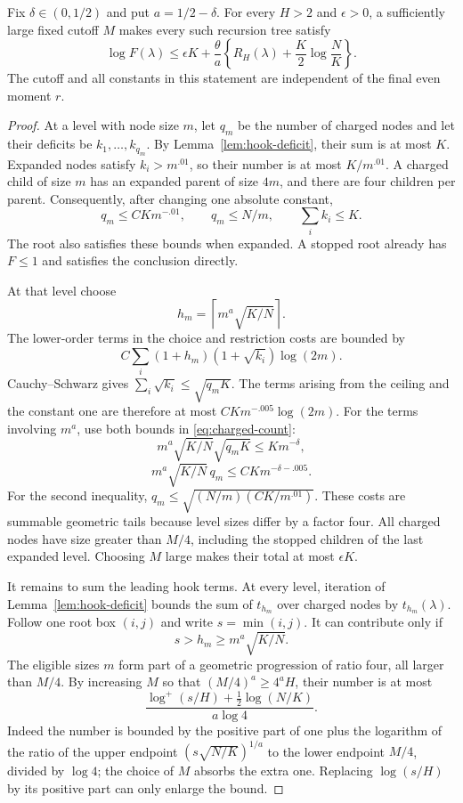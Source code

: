 \begin{lemma}\label{lem:tree-budget}
Fix $\delta\in(0,1/2)$ and put $a=1/2-\delta$. For every $H>2$ and $\epsilon>0$, a sufficiently large fixed cutoff $M$ makes every such recursion tree satisfy
\begin{equation}\label{eq:tree-budget}
 \log F(\lambda)\le\epsilon K+
 \frac\theta a\left\{
    R_H(\lambda)+\frac K2\log\frac NK\right\}.
\end{equation}
The cutoff and all constants in this statement are independent of the final even moment $r$.
\end{lemma}
\begin{proof}
At a level with node size $m$, let $q_m$ be the number of charged nodes and let their deficits be $k_1,\ldots,k_{q_m}$. By Lemma~\ref{lem:hook-deficit}, their sum is at most $K$. Expanded nodes satisfy $k_i>m^{.01}$, so their number is at most $K/m^{.01}$. A charged child of size $m$ has an expanded parent of size $4m$, and there are four children per parent. Consequently, after changing one absolute constant,
\begin{equation}\label{eq:charged-count}
 q_m\le C K m^{-.01},\qquad q_m\le N/m,
 \qquad\sum_i k_i\le K.
\end{equation}
The root also satisfies these bounds when expanded. A stopped root already has $F\le1$ and satisfies the conclusion directly.

At that level choose
\[
 h_m=\left\lceil m^a\sqrt{K/N}\right\rceil.
\]
The lower-order terms in the choice and restriction costs are bounded by
\[
 C\sum_i(1+h_m)(1+\sqrt{k_i})\log(2m).
\]
Cauchy--Schwarz gives $\sum_i\sqrt{k_i}\le\sqrt{q_mK}$. The terms arising from the ceiling and the constant one are therefore at most
$CKm^{-.005}\log(2m)$. For the terms involving $m^a$, use both bounds in \eqref{eq:charged-count}:
\[
 m^a\sqrt{K/N}\sqrt{q_mK}\le Km^{-\delta},
\]
\[
 m^a\sqrt{K/N}\,q_m
 \le CKm^{-\delta-.005}.
\]
For the second inequality, $q_m\le\sqrt{(N/m)(CK/m^{.01})}$. These costs are summable geometric tails because level sizes differ by a factor four. All charged nodes have size greater than $M/4$, including the stopped children of the last expanded level. Choosing $M$ large makes their total at most $\epsilon K$.

It remains to sum the leading hook terms. At every level, iteration of Lemma~\ref{lem:hook-deficit} bounds the sum of $t_{h_m}$ over charged nodes by $t_{h_m}(\lambda)$. Follow one root box $(i,j)$ and write $s=\min(i,j)$. It can contribute only if
\[
 s>h_m\ge m^a\sqrt{K/N}.
\]
The eligible sizes $m$ form part of a geometric progression of ratio four, all larger than $M/4$. By increasing $M$ so that $(M/4)^a\ge4^a H$, their number is at most
\[
 \frac{\log^+(s/H)+\tfrac12\log(N/K)}{a\log4}.
\]
Indeed the number is bounded by the positive part of one plus the logarithm of the ratio of the upper endpoint
$(s\sqrt{N/K})^{1/a}$ to the lower endpoint $M/4$, divided by $\log4$; the choice of $M$ absorbs the extra one. Replacing $\log(s/H)$ by its positive part can only enlarge the bound.


\end{proof}
